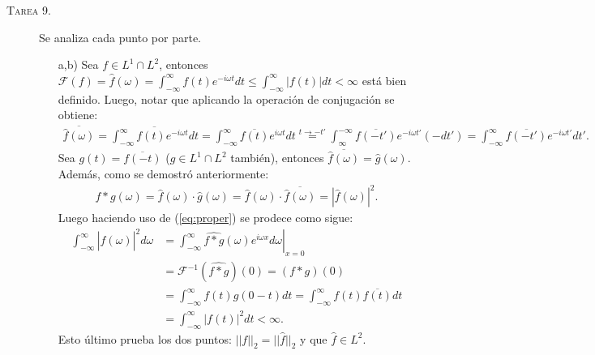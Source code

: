 \documentclass[spanish, fleqn]{article}
\begin{document}
\begin{description}
    \item[\textsc{Tarea 9.}] Se analiza cada punto por parte.
    \begin{itemize}
        \item[a,b)] Sea $f \in L^1 \cap L^2$, entonces $\displaystyle \mathcal{F}(f) = \widehat{f}(\omega) = \int_{-\infty}^{\infty} f(t) e^{-i \omega t} dt  \leq \int_{-\infty}^{\infty} |f(t)| dt < \infty$ está bien definido. Luego, notar que aplicando la operación de conjugación se obtiene:
        \begin{align*}
            \overline{\hat{f}(\omega)}=\overline{\int_{-\infty}^{\infty}f(t)e^{-i \omega t}dt}=\int_{-\infty}^{\infty}\overline{f(t)}e^{i\omega t}dt \stackrel{t \rightarrow -t'}{=} \int_{\infty}^{-\infty}\overline{f(-t')}e^{-i \omega t'}(-dt') = \int_{-\infty}^{\infty}\overline{f(-t')}e^{-i \omega t'}dt'.
        \end{align*}
        Sea $g(t)=\overline{f(-t)}$ ($g \in L^1 \cap L^2$ también), entonces $\overline{\hat{f}(\omega)}=\hat{g}(\omega)$. Además, como se demostró anteriormente:
        \begin{align}
            \widehat{f * g}(\omega) = \widehat{f}(\omega)\cdot \widehat{g}(\omega) =  \widehat{f}(\omega)\cdot \overline{\widehat{f}(\omega)} = \left| \widehat{f}(\omega) \right|^2.
        \label{eq:proper}
        \end{align} 
        Luego haciendo uso de (\ref{eq:proper}) se prodece como sigue:
        \begin{align}
       \int_{-\infty}^{\infty}|\widehat{f}(\omega)|^2d\omega & =\left.\int_{-\infty}^{\infty}\widehat{f * g}(\omega)e^{i \omega x}d\omega \right|_{x=0} \\
       & = \mathcal{F}^{-1}(\widehat{f * g})  (0) = (f * g)(0) \\
       & = \int_{-\infty}^{\infty}f(t)g(0-t)dt = \int_{-\infty}^{\infty}f(t)\overline{f(t)}dt  \\
       & = \int_{-\infty}^{\infty}|f(t)|^2dt <  \infty.
        \end{align}
        Esto último prueba los dos puntos: $||f||_2 = ||\widehat{f}||_2$ y que $\widehat{f} \in L^2$.
    \end{itemize}

\end{description}




\end{document}
